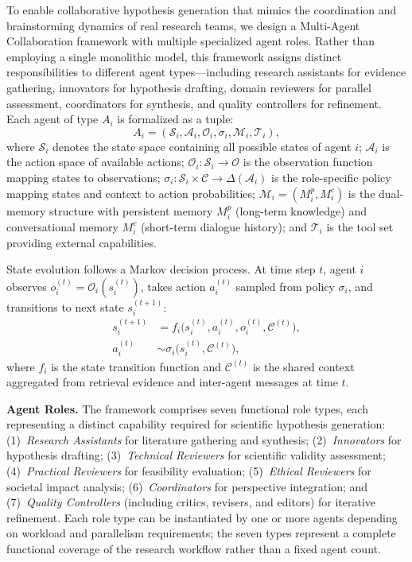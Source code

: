 \documentclass[runningheads]{llncs}
\begin{document}
To enable collaborative hypothesis generation that mimics the coordination and brainstorming dynamics of real research teams, we design a Multi-Agent Collaboration framework with multiple specialized agent roles. Rather than employing a single monolithic model, this framework assigns distinct responsibilities to different agent types---including research assistants for evidence gathering, innovators for hypothesis drafting, domain reviewers for parallel assessment, coordinators for synthesis, and quality controllers for refinement. Each agent of type $A_i$ is formalized as a tuple:
\begin{equation}
    A_i = (\mathcal{S}_i, \mathcal{A}_i, \mathcal{O}_i, \sigma_i, \mathcal{M}_i, \mathcal{T}_i),
\end{equation}
where $\mathcal{S}_i$ denotes the state space containing all possible states of agent $i$; $\mathcal{A}_i$ is the action space of available actions; $\mathcal{O}_i: \mathcal{S}_i \rightarrow \mathcal{O}$ is the observation function mapping states to observations; $\sigma_i: \mathcal{S}_i \times \mathcal{C} \rightarrow \Delta(\mathcal{A}_i)$ is the role-specific policy mapping states and context to action probabilities; $\mathcal{M}_i = (M_i^p, M_i^c)$ is the dual-memory structure with persistent memory $M_i^p$ (long-term knowledge) and conversational memory $M_i^c$ (short-term dialogue history); and $\mathcal{T}_i$ is the tool set providing external capabilities.

State evolution follows a Markov decision process. At time step $t$, agent $i$ observes $o_i^{(t)} = \mathcal{O}_i(s_i^{(t)})$, takes action $a_i^{(t)}$ sampled from policy $\sigma_i$, and transitions to next state $s_i^{(t+1)}$:
\begin{align}
    s_i^{(t+1)} &= f_i\big(s_i^{(t)}, a_i^{(t)}, o_i^{(t)}, \mathcal{C}^{(t)}\big), \\
    a_i^{(t)} &\sim \sigma_i\big(s_i^{(t)}, \mathcal{C}^{(t)}\big),
\end{align}
where $f_i$ is the state transition function and $\mathcal{C}^{(t)}$ is the shared context aggregated from retrieval evidence and inter-agent messages at time $t$.

\textbf{Agent Roles.} The framework comprises seven functional role types, each representing a distinct capability required for scientific hypothesis generation: (1)~\textit{Research Assistants} for literature gathering and synthesis; (2)~\textit{Innovators} for hypothesis drafting; (3)~\textit{Technical Reviewers} for scientific validity assessment; (4)~\textit{Practical Reviewers} for feasibility evaluation; (5)~\textit{Ethical Reviewers} for societal impact analysis; (6)~\textit{Coordinators} for perspective integration; and (7)~\textit{Quality Controllers} (including critics, revisers, and editors) for iterative refinement. Each role type can be instantiated by one or more agents depending on workload and parallelism requirements; the seven types represent a complete functional coverage of the research workflow rather than a fixed agent count.
\end{document}

